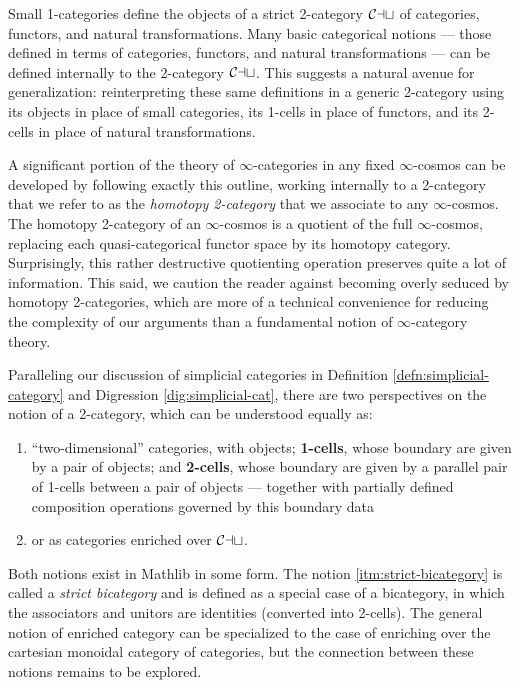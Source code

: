 Small 1-categories define the objects of a strict 2-category ${\mathord{\mathcal{Cat}}}$ of categories, functors, and natural transformations. Many basic categorical notions --- those defined in terms of categories, functors, and natural transformations --- can be defined internally to the 2-category ${\mathord{\mathcal{Cat}}}$. This suggests a natural avenue for generalization: reinterpreting these same definitions in a generic 2-category using its objects in place of small categories, its 1-cells in place of functors, and its 2-cells in place of natural transformations.

A significant portion of the theory of $\infty$-cat\-e\-go\-ries in any fixed $\infty$-cosmos can be developed by following exactly this outline, working internally to a 2-category that we refer to as the \emph{homotopy 2-category} that we associate to any $\infty$-cosmos. The homotopy 2-category of an $\infty$-cosmos is a quotient of the full $\infty$-cosmos, replacing each quasi-categorical functor space by its homotopy category. Surprisingly, this rather destructive quotienting operation preserves quite a lot of information.  This said, we caution the reader against becoming overly seduced by homotopy 2-categories, which are more of a technical convenience for reducing the complexity of our arguments than a fundamental notion of $\infty$-category theory.

Paralleling our discussion of simplicial categories in Definition \ref{defn:simplicial-category} and Digression \ref{dig:simplicial-cat}, there are two perspectives on the notion of a 2-category, which can be understood equally as:
\begin{enumerate}
\item\label{itm:strict-bicategory}  ``two-dimensional'' categories, with objects; \textbf{1-cells}, whose boundary are given by a pair of objects; and \textbf{2-cells}, whose boundary are given by a parallel pair of 1-cells between a pair of objects --- together with partially defined composition operations governed by this boundary data
\item or as categories enriched over ${\mathord{\mathcal{Cat}}}$.
\end{enumerate}

Both notions exist in Mathlib in some form. The notion \ref{itm:strict-bicategory} is called a \emph{strict bicategory} and is defined as a special case of a bicategory, in which the associators and unitors are identities (converted into 2-cells). The general notion of enriched category can be specialized to the case of enriching over the cartesian monoidal category of categories, but the connection between these notions remains to be explored.

